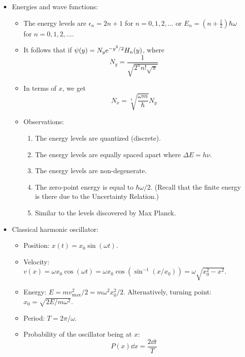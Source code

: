 \documentclass[../notes.tex]{subfiles}
\begin{document}
\begin{itemize}
\begin{itemize}
    \end{itemize}
    \item Energies and wave functions:
    \begin{itemize}
        \item The energy levels are $\epsilon_n=2n+1$ for $n=0,1,2,\dots$ or $E_n=(n+\frac{1}{2})\hbar\omega$ for $n=0,1,2,\dots$.
        \item It follows that if $\psi(y)=N_y\e[-y^2/2]H_n(y)$, where
        \begin{equation*}
            N_y = \frac{1}{\sqrt{2^nn!\sqrt{\pi}}}
        \end{equation*}
        \item In terms of $x$, we get
        \begin{equation*}
            N_x = \sqrt[4]{\frac{\omega m}{\hbar}}N_y
        \end{equation*}
        \item Observations:
        \begin{enumerate}
            \item The energy levels are quantized (discrete).
            \item The energy levels are equally spaced apart where $\Delta E=h\nu$.
            \item The energy levels are non-degenerate.
            \item The zero-point energy is equal to $\hbar\omega/2$. (Recall that the finite energy is there due to the Uncertainty Relation.)
            \item Similar to the levels discovered by Max Planck.
        \end{enumerate}
    \end{itemize}
    \item Classical harmonic oscillator:
    \begin{itemize}
        \item Position: $x(t)=x_0\sin(\omega t)$.
        \item Velocity: $v(x)=\omega x_0\cos(\omega t)=\omega x_0\cos(\sin^{-1}(x/x_0))=\omega\sqrt{x_0^2-x^2}$.
        \item Energy: $E=mv_\text{max}^2/2=m\omega^2x_0^2/2$. Alternatively, turning point: $x_0=\sqrt{2E/m\omega^2}$.
        \item Period: $T=2\pi/\omega$.
        \item Probability of the oscillator being at $x$:
        \begin{equation*}
            P(x)\dd{x} = \frac{2\dd{t}}{T}

\end{equation*}
\end{itemize}
\end{itemize}
\end{document}
